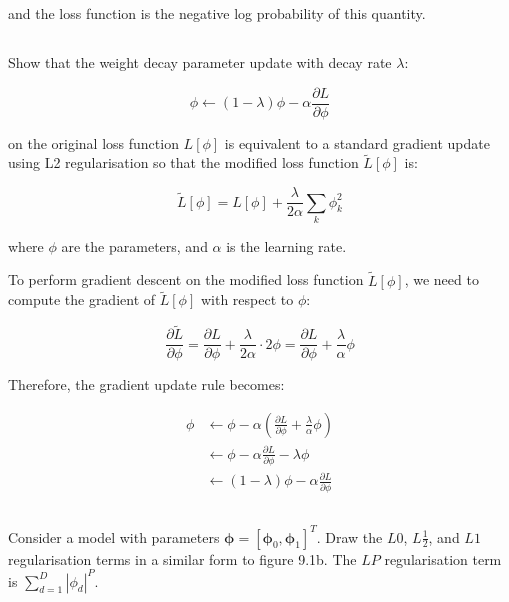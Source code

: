 \documentclass[12pt]{report}
\begin{document}
and the loss function is the negative log probability of this quantity.

\subsection{}
\begin{mdframed}
    Show that the weight decay parameter update with decay rate $\lambda$:

    \begin{equation*}
        \phi \leftarrow (1-\lambda)\phi - \alpha \frac{\partial L}{\partial \phi}
    \end{equation*}

    on the original loss function $L[\phi]$ is equivalent to a standard gradient update using L2 regularisation so that the modified loss function $\tilde{L}[\phi]$ is:

    \begin{equation*}
        \tilde{L}[\phi] = L[\phi] + \frac{\lambda}{2\alpha}\sum_{k}\phi_{k}^{2}
    \end{equation*}

    where $\phi$ are the parameters, and $\alpha$ is the learning rate.
\end{mdframed}

To perform gradient descent on the modified loss function $\tilde{L}[\phi]$, we need to compute the gradient of $\tilde{L}[\phi]$ with respect to $\phi$:

\begin{equation*}
    \frac{\partial \tilde{L}}{\partial \phi} = \frac{\partial L}{\partial \phi} + \frac{\lambda}{2\alpha}\cdot 2\phi = \frac{\partial L}{\partial \phi} + \frac{\lambda}{\alpha}\phi
\end{equation*}

Therefore, the gradient update rule becomes:

\begin{align*}
    \phi & \leftarrow \phi - \alpha\left(\frac{\partial L}{\partial \phi} + \frac{\lambda}{\alpha}\phi\right) \\
         & \leftarrow \phi - \alpha\frac{\partial L}{\partial \phi} - \lambda\phi                             \\
         & \leftarrow (1-\lambda)\phi - \alpha\frac{\partial L}{\partial \phi}
\end{align*}

\subsection{}
\begin{mdframed}
    Consider a model with parameters $\boldsymbol{\phi} = [\boldsymbol{\phi}_{0}, \boldsymbol{\phi}_{1}]^{T}$. Draw the $L0$, $L\frac{1}{2}$, and $L1$ regularisation terms in a similar form to figure 9.1b. The $LP$ regularisation term is $\sum_{d=1}^{D}|\phi_{d}|^{P}$.
\end{mdframed}
\end{document}
